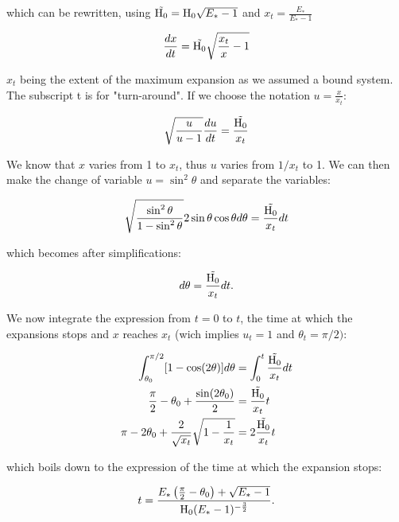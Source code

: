 which can be rewritten, using $\tilde{{\textrm{H}}_0} = {\textrm{H}}_0 \sqrt{E_\ast-1}$ and $x_t=\frac{E_\ast}{E_\ast-1}$

\begin{equation}
\frac{dx}{dt} = \tilde{{\textrm{H}}_0} \sqrt{\frac{x_t}{x}-1}
\end{equation}

$x_t$ being the extent of the maximum expansion as we assumed a bound system. The subscript t is for "turn-around". If we choose the notation $u = \frac{x}{x_t}$:

\begin{equation}
\sqrt{\frac{u}{u-1}} \frac{du}{dt} = \frac{\tilde{{\textrm{H}}_0}}{x_t}
\end{equation}

We know that $x$ varies from 1 to $x_t$, thus $u$ varies from $1/x_t$ to 1. We can then make the change of variable $u = \sin^2\theta$ and separate the variables:

\begin{equation}
\sqrt{\frac{\sin^2\theta}{1-\sin^2\theta}} 2 \sin\theta \cos\theta d \theta = \frac{\tilde{{\textrm{H}}_0}}{x_t} dt
\end{equation}

which becomes after simplifications:

\begin{equation}
[ 1 - \cos(2\theta)]d\theta = \frac{\tilde{\Hub_0}}{x_t} dt .
\end{equation}


We now integrate the expression from $t=0$ to $t$, the time at which the expansions stops and $x$ reaches $x_t$ (wich implies $u_t = 1$ and $\theta_t = \pi /2)$:

\begin{align}
\int^{\pi/2}_{\theta_0} [ 1 - \cos(2\theta)]d\theta  & = \int^t_0 \frac{\tilde{{\textrm{H}}_0}}{x_t} dt\\
\frac{\pi}{2} - \theta_0 + \frac{\sin(2\theta_0)}{2} & =  \frac{\tilde{{\textrm{H}}_0}}{x_t} t\\
\pi - 2 \theta_0 + \frac{2}{\sqrt{x_t}}\sqrt{1-\frac{1}{x_t}} & = 2 \frac{\tilde{{\textrm{H}}_0}}{x_t} t 
\end{align}

which boils down to the expression of the time at which the expansion stops:

\begin{equation}
t = \frac{E_\ast \left(\frac{\pi}{2} - \theta_0\right) + \sqrt{E_\ast-1}}{{\textrm{H}}_0 (E_\ast-1)^{-\frac{3}{2}}}.
\end{equation}

